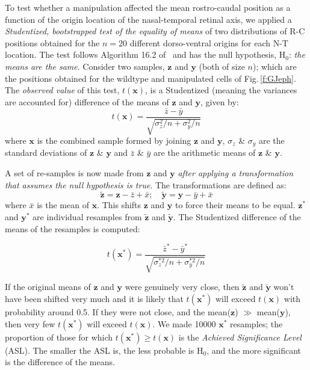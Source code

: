 \documentclass[11pt, a4paper]{article}
\begin{document}
To test whether a manipulation affected the mean rostro-caudal position as a function of the origin location of the nasal-temporal retinal axis, we applied a \emph{Studentized, bootstrapped test of the equality of means} of two distributions of R-C positions obtained for the $n=20$ different dorso-ventral origins for each N-T location. 
The test follows Algorithm 16.2 of~\cite{efron_introduction_1993} and has the null hypothesis, H$_0$: \emph{the means are the same}.
Consider two samples, $\textbf{z}$ and $\textbf{y}$ (both of size $n$); which are the positions obtained for the wildtype and manipulated cells of Fig.\,\ref{f:GJeph}.
The \emph{observed value} of this test, $t(\textbf{x})$, is a Studentized (meaning the variances are accounted for) difference of the means of $\textbf{z}$ and $\textbf{y}$, given by:
%
$$t(\textbf{x}) =  \frac{\bar{z} - \bar{y}}{\sqrt{\sigma_{z}^2/n + \sigma_{y}^2/n} } $$
%
where $\textbf{x}$ is the combined sample formed by joining $\textbf{z}$ and $\textbf{y}$, $\sigma_z$ \& $\sigma_y$ are the standard deviations of $\textbf{z}$ \& $\textbf{y}$ and $\bar{z}$ \& $\bar{y}$ are the arithmetic means of $\textbf{z}$ \& $\textbf{y}$.

A set of re-samples is now made from $\textbf{z}$ and $\textbf{y}$ \emph{after applying a transformation that assumes the null hypothesis is true}.
The transformations are defined as:
%
$$ \tilde{\textbf{z}} = \textbf{z} - \bar{z} + \bar{x}; \quad \tilde{\textbf{y}} = \textbf{y} - \bar{y} + \bar{x} $$
%
where $\bar{x}$ is the mean of $\textbf{x}$. This shifts $\textbf{z}$ and $\textbf{y}$ to force their means to be equal.
$\textbf{z}^*$ and $\textbf{y}^*$ are individual resamples from $\tilde{\textbf{z}}$ and $\tilde{\textbf{y}}$. 
The Studentized difference of the means of the resamples is computed:

$$t(\textbf{x}^*) =  \frac{\bar{z}^* - \bar{y}^*}{\sqrt{\sigma_{z}^{*2}/n + \sigma_{y}^{*2}/n} } $$

If the original means of $\textbf{z}$ and $\textbf{y}$ were genuinely very close, then $\tilde{\textbf{z}}$ and $\tilde{\textbf{y}}$ won't have been shifted very much and it is likely that $t(\textbf{x}^*)$ will exceed $t(\textbf{x})$ with probability around 0.5.
If they were not close, and the mean($\textbf{z}$) $\gg$ mean($\textbf{y}$), then very few $t(\textbf{x}^*)$ will exceed $t(\textbf{x})$. 
We made 10000 $\textbf{x}^*$ resamples; the proportion of those for which $t(\textbf{x}^*) \geq t(\textbf{x})$ is the \emph{Achieved Significance Level} (ASL). 
The smaller the ASL is, the less probable is H$_0$, and the more significant is the difference of the means.
\end{document}
